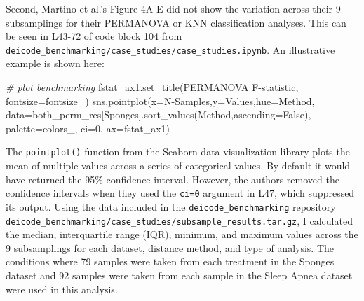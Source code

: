 \documentclass[
]{article}
\newenvironment{Shaded}{}{}
\newcommand{\CommentTok}[1]{\textcolor[rgb]{0.63,0.63,0.65}{\textit{#1}}}
\newcommand{\DecValTok}[1]{\textcolor[rgb]{0.60,0.41,0.00}{#1}}
\newcommand{\NormalTok}[1]{\textcolor[rgb]{0.22,0.23,0.26}{#1}}
\newcommand{\OperatorTok}[1]{\textcolor[rgb]{0.65,0.15,0.64}{#1}}
\newcommand{\StringTok}[1]{\textcolor[rgb]{0.31,0.63,0.31}{#1}}
\newcommand{\VariableTok}[1]{\textcolor[rgb]{0.89,0.34,0.29}{#1}}
\begin{document}
Second, Martino et al.'s Figure 4A-E did not show the variation across
their 9 subsamplings for their PERMANOVA or KNN classification analyses.
This can be seen in L43-72 of code block 104 from
\texttt{deicode\_benchmarking/case\_studies/case\_studies.ipynb}. An
illustrative example is shown here:

\footnotesize

\begin{Shaded}
\begin{Highlighting}[numbers=left,,firstnumber=43,]
\CommentTok{\# plot benchmarking}
\NormalTok{fstat\_ax1.set\_title(}\StringTok{\textquotesingle{}PERMANOVA F{-}statistic\textquotesingle{}}\NormalTok{, fontsize}\OperatorTok{=}\NormalTok{fontsize\_)}
\NormalTok{sns.pointplot(x}\OperatorTok{=}\StringTok{\textquotesingle{}N{-}Samples\textquotesingle{}}\NormalTok{,y}\OperatorTok{=}\StringTok{\textquotesingle{}Values\textquotesingle{}}\NormalTok{,hue}\OperatorTok{=}\StringTok{\textquotesingle{}Method\textquotesingle{}}\NormalTok{,}
\NormalTok{              data}\OperatorTok{=}\NormalTok{both\_perm\_res[}\StringTok{\textquotesingle{}Sponges\textquotesingle{}}\NormalTok{].sort\_values(}\StringTok{\textquotesingle{}Method\textquotesingle{}}\NormalTok{,ascending}\OperatorTok{=}\VariableTok{False}\NormalTok{),}
\NormalTok{              palette}\OperatorTok{=}\NormalTok{colors\_, ci}\OperatorTok{=}\DecValTok{0}\NormalTok{, ax}\OperatorTok{=}\NormalTok{fstat\_ax1)}
\end{Highlighting}
\end{Shaded}

\normalsize{}

The \texttt{pointplot()} function from the Seaborn data visualization
library plots the mean of multiple values across a series of categorical
values. By default it would have returned the 95\% confidence interval.
However, the authors removed the confidence intervals when they used the
\texttt{ci=0} argument in L47, which suppressed its output. Using the
data included in the \texttt{deicode\_benchmarking} repository
\texttt{deicode\_benchmarking/case\_studies/subsample\_results.tar.gz},
I calculated the median, interquartile range (IQR), minimum, and maximum
values across the 9 subsamplings for each dataset, distance method, and
type of analysis. The conditions where 79 samples were taken from each
treatment in the Sponges dataset and 92 samples were taken from each
sample in the Sleep Apnea dataset were used in this analysis.

\end{document}
